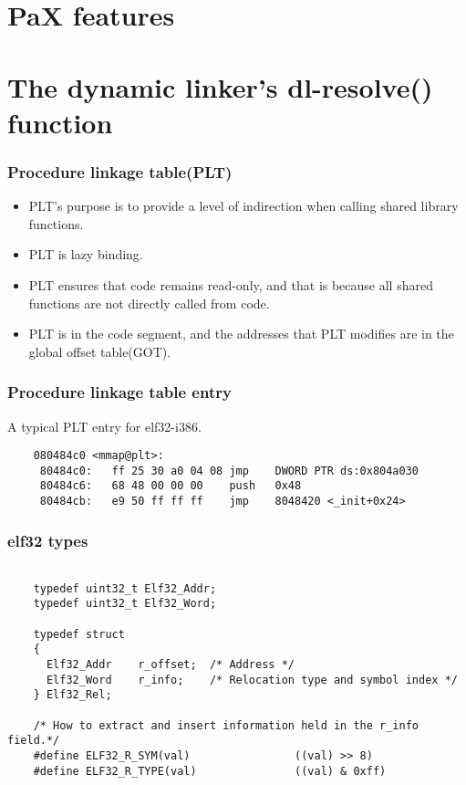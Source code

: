 \documentclass[10pt]{beamer}
\begin{document}
\section{PaX features}  %





\section{The dynamic linker's dl-resolve() function}  %

\begin{frame}[fragile]
\frametitle{Procedure linkage table(PLT)}

 \begin{itemize}
    \item PLT's purpose is to provide a level of indirection when calling shared library functions.
    \item PLT is lazy binding.
    \item PLT ensures that code remains read-only, and that is because all shared functions are not directly called from code.
    \item PLT is in the code segment, and the addresses that PLT modifies are in the global offset table(GOT).
  \end{itemize}

\end{frame}

\begin{frame}[fragile]
\frametitle{Procedure linkage table entry}
A typical PLT entry for elf32-i386.
	\begin{verbatim}
	080484c0 <mmap@plt>:
	 80484c0:	ff 25 30 a0 04 08 jmp    DWORD PTR ds:0x804a030
	 80484c6:	68 48 00 00 00    push   0x48
	 80484cb:	e9 50 ff ff ff    jmp    8048420 <_init+0x24>
	\end{verbatim}


\end{frame}

\begin{frame}[fragile]
\frametitle{elf32 types}

	\footnotesize
	\begin{verbatim}

	typedef uint32_t Elf32_Addr;
	typedef uint32_t Elf32_Word;

	typedef struct
	{
	  Elf32_Addr    r_offset;  /* Address */
	  Elf32_Word    r_info;    /* Relocation type and symbol index */
	} Elf32_Rel;

	/* How to extract and insert information held in the r_info field.*/
	#define ELF32_R_SYM(val)                ((val) >> 8)
	#define ELF32_R_TYPE(val)               ((val) & 0xff)
	\end{verbatim}
	\normalsize

\end{frame}
\end{document}
